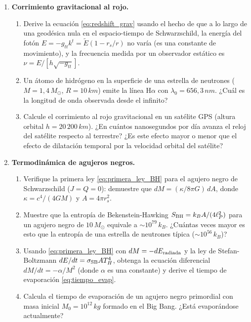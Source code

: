 \begin{enumerate}[leftmargin=2em, label=\textbf{P\thechapter.\arabic*.}]
  \item \textbf{Corrimiento gravitacional al rojo.}
  \begin{enumerate}[label=(\alph*)]
    \item Derive la ecuación \eqref{eq:redshift_grav} usando el hecho de que a lo largo de una geodésica nula en el espacio-tiempo de Schwarzschild, la energía del fotón $E = -g_{tt}k^t = \tilde{E}(1-r_s/r)$ no varía (es una constante de movimiento), y la frecuencia medida por un observador estático es $\nu = E/[h\sqrt{-g_{tt}}]$.
    \item Un átomo de hidrógeno en la superficie de una estrella de neutrones ($M = 1{,}4\,M_\odot$, $R = 10\,\si{km}$) emite la línea H$\alpha$ con $\lambda_0 = 656{,}3\,\si{nm}$. ¿Cuál es la longitud de onda observada desde el infinito?
    \item Calcule el corrimiento al rojo gravitacional en un satélite GPS (altura orbital $h = 20\,200\,\si{km}$). ¿En cuántos nanosegundos por día avanza el reloj del satélite respecto al terrestre? ¿Es este efecto mayor o menor que el efecto de dilatación temporal por la velocidad orbital del satélite?
  \end{enumerate}

  \item \textbf{Termodinámica de agujeros negros.}
  \begin{enumerate}[label=(\alph*)]
    \item Verifique la primera ley \eqref{eq:primera_ley_BH} para el agujero negro de Schwarzschild ($J = Q = 0$): demuestre que $dM = (\kappa/8\pi G)\,dA$, donde $\kappa = c^4/(4GM)$ y $A = 4\pi r_s^2$.
    \item Muestre que la entropía de Bekenstein-Hawking $S_{\rm BH} = k_B A/(4\ell_P^2)$ para un agujero negro de $10\,M_\odot$ equivale a $\sim 10^{79}\,k_B$. ¿Cuántas veces mayor es esto que la entropía de una estrella de neutrones típica ($\sim 10^{56}\,k_B$)?
    \item Usando \eqref{eq:primera_ley_BH} con $dM = -dE_{\rm radiada}$ y la ley de Stefan-Boltzmann $dE/dt = \sigma_{\rm SB}A T_H^4$, obtenga la ecuación diferencial $dM/dt = -\alpha/M^2$ (donde $\alpha$ es una constante) y derive el tiempo de evaporación \eqref{eq:tiempo_evap}.
    \item Calcula el tiempo de evaporación de un agujero negro primordial con masa inicial $M_0 = 10^{12}\,\si{kg}$ formado en el Big Bang. ¿Está evaporándose actualmente?
  \end{enumerate}


\end{enumerate}
